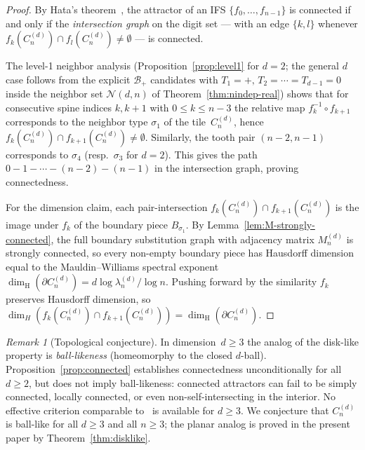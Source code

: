 \documentclass{amsart}
\theoremstyle{definition}
\theoremstyle{remark}
\newtheorem{remark}[theorem]{Remark}
\newcommand{\dH}{\dim_{\mathrm{H}}}
\begin{document}
\begin{proof}
By Hata's theorem~\cite{hata}, the attractor of an IFS
$\{f_0, \ldots, f_{n-1}\}$ is connected if and only if the
\emph{intersection graph} on the digit set --- with an edge
$\{k, l\}$ whenever $f_k(C_n^{(d)}) \cap f_l(C_n^{(d)}) \neq \emptyset$ --- is
connected.

The level-1 neighbor analysis (Proposition~\ref{prop:level1} for
$d = 2$; the general $d$ case follows from the explicit
$\mathcal{B}_+$ candidates with $T_1 = +,\, T_2 = \cdots = T_{d-1}
= 0$ inside the neighbor set
$\mathcal{N}(d, n)$ of
Theorem~\ref{thm:nindep-real}) shows that for
consecutive spine indices $k, k+1$ with $0 \le k \le n-3$ the
relative map $f_k^{-1} \circ f_{k+1}$ corresponds to the
neighbor type $\sigma_1$ of the tile~$C_n^{(d)}$, hence
$f_k(C_n^{(d)}) \cap f_{k+1}(C_n^{(d)}) \neq \emptyset$.
Similarly, the tooth pair $(n{-}2, n{-}1)$ corresponds to
$\sigma_4$ (resp.\ $\sigma_3$ for $d = 2$).  This gives the path
$0 - 1 - \cdots - (n{-}2) - (n{-}1)$ in the intersection graph,
proving connectedness.

For the dimension claim, each pair-intersection
$f_k(C_n^{(d)}) \cap f_{k+1}(C_n^{(d)})$ is the image under
$f_k$ of the boundary piece $B_{\sigma_1}$.  By
Lemma~\ref{lem:M-strongly-connected}, the full boundary
substitution graph with adjacency matrix $M_n^{(d)}$ is strongly
connected, so every non-empty boundary piece has Hausdorff
dimension equal to the Mauldin--Williams spectral exponent
$\dH(\partial C_n^{(d)}) = d \log \lambda_n^{(d)} / \log n$.
Pushing forward by the similarity $f_k$ preserves Hausdorff
dimension, so $\dim_H(f_k(C_n^{(d)}) \cap f_{k+1}(C_n^{(d)}))
= \dH(\partial C_n^{(d)})$.
\end{proof}

\begin{remark}[Topological conjecture]
\label{rem:topological-conjecture}
In dimension~$d \ge 3$ the analog of the disk-like property is
\emph{ball-likeness} (homeomorphy to the closed $d$-ball).
Proposition~\ref{prop:connected} establishes connectedness
unconditionally for all $d \ge 2$, but does not imply
ball-likeness: connected attractors can fail to be simply
connected, locally connected, or even non-self-intersecting in
the interior.
No effective criterion comparable
to~\cite{loridant-luo-thuswaldner} is available for $d \ge 3$.
We conjecture that $C_n^{(d)}$ is ball-like for all $d \ge 3$
and all $n \ge 3$; the planar analog is proved in the present
paper by Theorem~\ref{thm:disklike}.
\end{remark}
\end{document}
